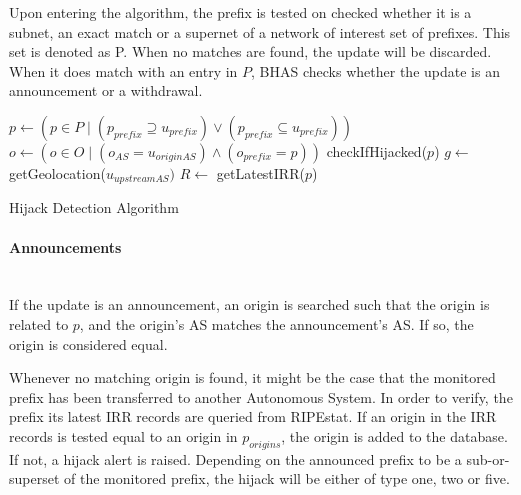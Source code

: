 Upon entering the algorithm, the prefix is tested on checked whether it is a subnet, an exact match or a supernet of a network of interest set of prefixes. This set is denoted as P. When no matches are found, the update will be discarded. When it does match with an entry in $P$, BHAS checks whether the update is an announcement or a withdrawal. 

\begin{algorithm}[h]
\begin{algorithmic}[1]
    \State $p \gets (p \in P \mid (p_{prefix} \supseteq u_{prefix}) \lor (p_{prefix} \subseteq u_{prefix}))$
            \State $o \gets (o \in O \mid (o_{AS} = u_{originAS}) \land (o_{prefix} = p))$
                    \State checkIfHijacked($p$)
                \Else
                    \State $g \gets$ getGeolocation($u_{upstreamAS})$
                    \EndIf
                \EndIf
            \EndIf
        \Else
            \State $R \gets $ getLatestIRR($p$)
            \EndIf
        \EndIf
        \EndIf
    \EndIf
{}
\EndIf
\EndProcedure
{}
\EndIf
\EndFunction
\end{algorithmic}
\caption{Hijack Detection Algorithm}
\label{alg:bhas}
\end{algorithm}

\paragraph{Announcements}\label{par:announcements}\mbox{}\\
If the update is an announcement, an origin is searched such that the origin is related to $p$, and the origin's AS matches the announcement's AS. If so, the origin is considered equal.\par
Whenever no matching origin is found, it might be the case that the monitored prefix has been transferred to another Autonomous System. In order to verify, the prefix its latest IRR records are queried from RIPEstat. If an origin in the IRR records is tested equal to an origin in $p_{origins}$, the origin is added to the database. If not, a hijack alert is raised. Depending on the announced prefix to be a sub-or-superset of the monitored prefix, the hijack will be either of type one, two or five.\par

